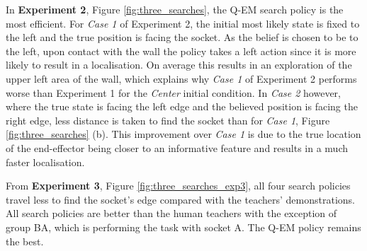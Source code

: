In \textbf{Experiment 2}, Figure \ref{fig:three_searches}, the Q-EM search policy is the most efficient. For \textit{Case 1} 
of Experiment 2, the initial most likely state is fixed to the left and the true position is facing the socket. 
As the belief is chosen to be to the left, upon contact with the wall the policy takes a left action since it 
is more likely to result in a localisation. 
On average this results in an exploration of the upper left area of the wall, which explains why \textit{Case 1} of Experiment 2 
performs worse than Experiment 1 for the \textit{Center} initial condition. In \textit{Case 2} however, where the 
true state is facing the left edge and the believed position is facing the right edge, less distance is taken to find the 
socket than for \textit{Case 1}, Figure \ref{fig:three_searches} (b). This improvement over \textit{Case 1} is due to the true location of 
the end-effector being closer to an informative feature and results in a much faster localisation.

From \textbf{Experiment 3}, Figure \ref{fig:three_searches_exp3}, all four search policies travel 
less to find the socket's edge compared with the teachers' demonstrations. 
All search policies are better than the human teachers with the exception of group BA, 
which is performing the task with socket A. The Q-EM policy remains the best. 

